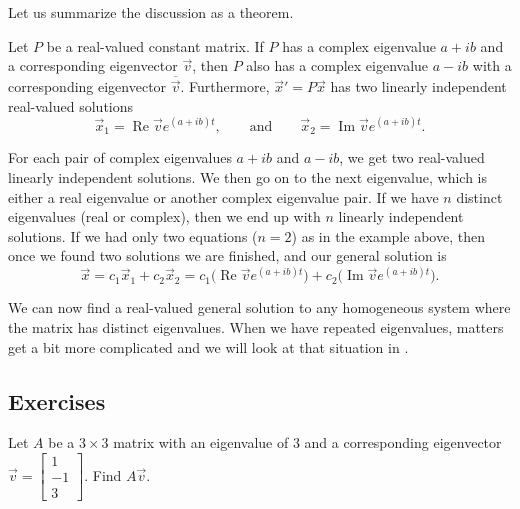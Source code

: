 \medskip

Let us summarize the discussion as a theorem.

\begin{theorem}
Let $P$ be a real-valued constant matrix.
If $P$ has a complex eigenvalue $a+ib$ and a corresponding eigenvector
$\vec{v}$, then $P$ also has a complex eigenvalue $a-ib$ with
a corresponding eigenvector $\overline{\vec{v}}$.
Furthermore,
${\vec{x}}' = P\vec{x}$ has
two linearly independent real-valued solutions
\begin{equation*}
\vec{x}_1 = \operatorname{Re} \vec{v} e^{(a+ib)t} ,
\qquad
\text{and}
\qquad
\vec{x}_2 = \operatorname{Im} \vec{v} e^{(a+ib)t} .
\end{equation*}
\end{theorem}

For each pair of complex eigenvalues $a+ib$ and $a-ib$,
we get two real-valued linearly
independent solutions.
We then go on to the next
eigenvalue, which is either a real eigenvalue or another complex eigenvalue
pair.  If we have $n$ distinct eigenvalues (real or complex), then we end up with $n$ linearly independent solutions.
If we had only two equations ($n=2$) as in the example above,
then once we found two solutions we are
finished, and our general solution is
\begin{equation*}
\vec{x} =
c_1 \vec{x}_1 + c_2 \vec{x}_2
= 
c_1 \bigl( \operatorname{Re} \vec{v} e^{(a+ib)t} \bigr) +
c_2 \bigl( \operatorname{Im} \vec{v} e^{(a+ib)t} \bigr)
.
\end{equation*}

We can now find a real-valued general solution to any homogeneous
system where the matrix has distinct eigenvalues.  When we have repeated
eigenvalues, matters get a bit more complicated and we will look at that
situation in .

\subsection{Exercises}

\begin{exercise}[easy]
Let $A$ be a $3 \times 3$ matrix with an eigenvalue of 3 and a
corresponding eigenvector $\vec{v} =
\left[ \begin{smallmatrix} 1 \\ -1 \\ 3 \end{smallmatrix} \right]$.
Find $A \vec{v}$.
\end{exercise}

